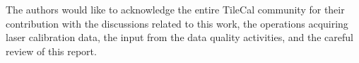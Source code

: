 \documentclass[a4paper,11pt]{article}
\begin{document}
The authors would like to acknowledge the entire TileCal community for their contribution with the discussions related to this work, the operations acquiring laser calibration data, the input from the data quality activities, and the careful review of this report.






\end{document}
